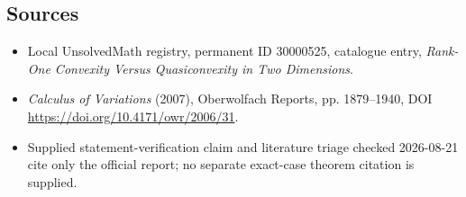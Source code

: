 \documentclass[11pt]{article}
\begin{document}
\subsection{Sources}
\begin{itemize}
\item Local UnsolvedMath registry, permanent ID 30000525, catalogue entry, \emph{Rank-One Convexity Versus Quasiconvexity in Two Dimensions}.
\item \emph{Calculus of Variations} (2007), Oberwolfach Reports, pp. 1879--1940, DOI \url{https://doi.org/10.4171/owr/2006/31}.
\item Supplied statement-verification claim and literature triage checked 2026-08-21 cite only the official report; no separate exact-case theorem citation is supplied.
\end{itemize}
\end{document}
